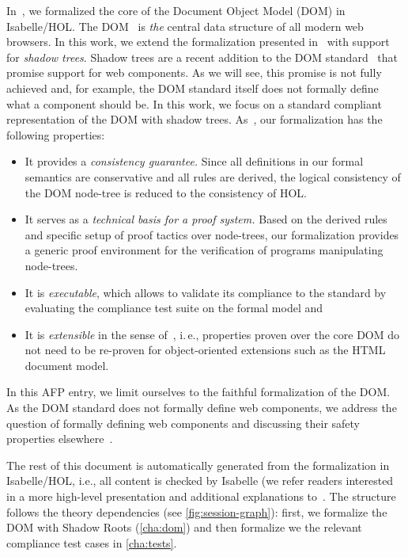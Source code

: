 \documentclass[10pt,DIV16,a4paper,abstract=true,twoside=semi,openright]
{scrreprt}
\newcommand{\ie}{i.\,e.\xspace}
\begin{document}
In~\cite{brucker.ea:afp-core-dom:2018}, we formalized the core of the
Document Object Model (DOM) in Isabelle/HOL\@. The
DOM~\cite{whatwg:dom:2017,w3c:dom:2015} is \emph{the} central data
structure of all modern web browsers. In this work, we extend the
formalization presented in~\cite{brucker.ea:afp-core-dom:2018} with
support for \emph{shadow trees}. Shadow trees are a recent addition to
the DOM standard~\cite{whatwg:dom:2017} that promise support for web
components. As we will see, this promise is not fully achieved and,
for example, the DOM standard itself does not formally define what a
component should be. In this work, we focus on a standard compliant
representation of the DOM with shadow
trees. As~\cite{brucker.ea:afp-core-dom:2018}, our formalization has
the following properties:
\begin{itemize}
\item It provides a \emph{consistency guarantee.} Since all
  definitions in our formal semantics are conservative and all rules
  are derived, the logical consistency of the DOM node-tree is reduced
  to the consistency of HOL.
\item It serves as a \emph{technical basis for a proof system.}  Based
  on the derived rules and specific setup of proof tactics over
  node-trees, our formalization provides a generic proof environment
  for the verification of programs manipulating node-trees.
\item It is \emph{executable}, which allows to validate its compliance
  to the standard by evaluating the compliance test suite on the
  formal model and
\item It is \emph{extensible} in the sense
  of~\cite{brucker.ea:extensible:2008-b,brucker:interactive:2007},
  \ie, properties proven over the core DOM do not need to be re-proven
  for object-oriented extensions such as the HTML document model.
\end{itemize}

In this AFP entry, we limit ourselves to the faithful formalization of
the DOM. As the DOM standard does not formally define web components,
we address the question of formally defining web components and
discussing their safety properties
elsewhere~\cite{brucker.ea:afp-dom-components:2020,brucker.ea:web-components:2019}.

The rest of this document is automatically generated from the
formalization in Isabelle/HOL, i.e., all content is checked by
Isabelle (we refer readers interested in a more high-level presentation 
and additional explanations to~\cite{herzberg:web-components:2020,brucker.ea:web-components:2019}. 
The structure follows the theory dependencies 
(see \autoref{fig:session-graph}): first, we
formalize the DOM with Shadow Roots (\autoref{cha:dom}) and then
formalize we the relevant compliance test cases in
\autoref{cha:tests}.
\end{document}
